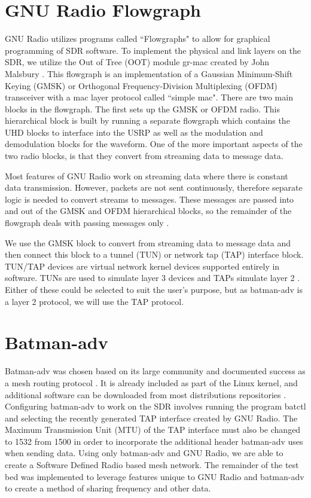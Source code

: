\section{GNU Radio Flowgraph}

GNU Radio utilizes programs called ``Flowgraphs" to allow for graphical programming of SDR software. To implement the physical and link layers on the SDR, we utilize the Out of Tree (OOT) module gr-mac created by John Malsbury \cite{0015}. This flowgraph is an implementation of a Gaussian Minimum-Shift Keying (GMSK) or Orthogonal Frequency-Division Multiplexing (OFDM) transceiver with a mac layer protocol called ``simple mac". There are two main blocks in the flowgraph. The first sets up the GMSK or OFDM radio. This hierarchical block is built by running a separate flowgraph which contains the UHD blocks to interface into the USRP as well as the modulation and demodulation blocks for the waveform. One of the more important aspects of the two radio blocks, is that they convert from streaming data to message data. 

Most features of GNU Radio work on streaming data where there is constant data transmission. However, packets are not sent continuously, therefore separate logic is needed to convert streams to messages. These messages are passed into and out of the GMSK and OFDM hierarchical blocks, so the remainder of the flowgraph deals with passing messages only \cite{6737601}. 

We use the GMSK block to convert from streaming data to message data and then connect this block to a tunnel (TUN) or network tap (TAP) interface block. TUN/TAP devices are virtual network kernel devices supported entirely in software. TUNs are used to simulate layer 3 devices and TAPs simulate layer 2 \cite{0017}. Either of these could be selected to suit the user's purpose, but as batman-adv is a layer 2 protocol, we will use the TAP protocol.

\section{Batman-adv}

Batman-adv was chosen based on its large community and documented success as a mesh routing protocol \cite{5375690}. It is already included as part of the Linux kernel, and additional software can be downloaded from most distributions repositories \cite{0008}. Configuring batman-adv to work on the SDR involves running the program batctl and selecting the recently generated TAP interface created by GNU Radio. The Maximum Transmission Unit (MTU) of the TAP interface must also be changed to 1532 from 1500 in order to incorporate the additional header batman-adv uses when sending data. Using only batman-adv and GNU Radio, we are able to create a Software Defined Radio based mesh network. The remainder of the test bed was implemented to leverage features unique to GNU Radio and batman-adv to create a method of sharing frequency and other data. 

